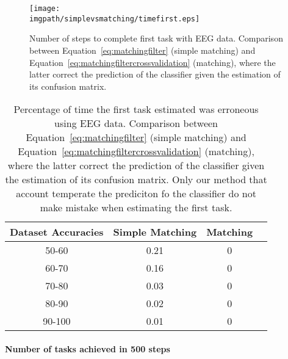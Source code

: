 \begin{figure}[!ht]
\centering
\texttt{[image: \\imgpath/simplevsmatching/timefirst.eps]}
\caption{Number of steps to complete first task with EEG data. Comparison between Equation~\ref{eq:matchingfilter} (simple matching) and Equation~\ref{eq:matchingfiltercrossvalidation} (matching), where the latter correct the prediction of the classifier given the estimation of its confusion matrix. 
}
\label{fig:timefirst_simplevsmatching}
\end{figure} 

\begin{table}
\centering
{}
\begin{tabular}{c c c c}
    Dataset Accuracies & Simple Matching &  Matching \\ \hline
    50-60 & 0.21 & 0 \\ 
    60-70 & 0.16 & 0 \\
    70-80 & 0.03 & 0 \\
    80-90 & 0.02 & 0 \\
    90-100 & 0.01 & 0 \\
\end{tabular}
\caption{Percentage of time the first task estimated was erroneous using EEG data. Comparison between Equation~\ref{eq:matchingfilter} (simple matching) and Equation~\ref{eq:matchingfiltercrossvalidation} (matching), where the latter correct the prediction of the classifier given the estimation of its confusion matrix. Only our method that account temperate the prediciton fo the classifier do not make mistake when estimating the first task.}
\label{tab:errorTaskRatiosimplevsmatching}
\end{table}

\paragraph{Number of tasks achieved in 500 steps}

